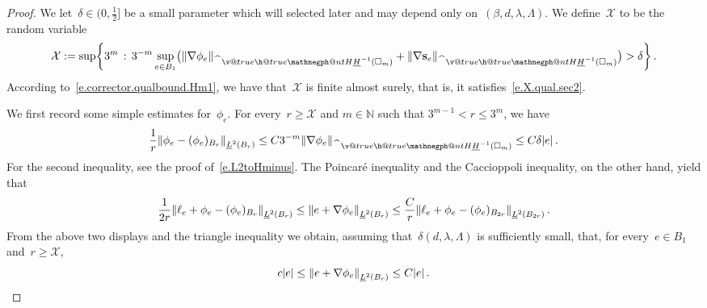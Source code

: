 \documentclass[11pt]{article} %
\makeatletter
\let\oldsquare\square %
\renewcommand{\square}{\oldsquare}
\numberwithin{equation}{section}
\theoremstyle{definition}
\let\originalleft\left
\let\originalright\right
\renewcommand{\left}{\mathopen{}\mathclose\bgroup\originalleft}
\renewcommand{\right}{\aftergroup\egroup\originalright}
\newcommand*{\N}{\ensuremath{\mathbb{N}}}
\renewcommand*{\hat}{\widehat}
\newcommand{\s}{\mathbf{s}}
\newcommand{\cu}{\square}
\newcommand{\X}{\mathcal{X}}
\newcommand{\negphantom}{\v@true\h@true\negph@nt}
\newcommand{\negph@nt}{\ifmmode\expandafter\mathpalette 
  \expandafter\mathnegph@nt\else\expandafter\makenegph@nt\fi}
\newcommand{\makenegph@nt}[1]{%
  \setbox\z@\hbox{\color@begingroup#1\color@endgroup}\finnegph@nt}
\newcommand{\finnegph@nt}{%
  \setbox\tw@\null 
  \ifv@ \ht\tw@\ht\z@\dp\tw@\dp\z@\fi \ifh@\wd\tw@-\wd\z@\fi\box\tw@}
\newcommand{\mathnegph@nt}[2]{%
  \setbox\z@\hbox{$\m@th #1{#2}$}\finnegph@nt}
\newcommand{\Hminusul}{\hat{\phantom{H}}\negphantom{H}\underline{H}^{-1}}
\makeatother
\begin{document}
\begin{proof}
We let~$\delta\in (0,\tfrac12]$ be a small parameter which will selected later and may depend only on~$(\beta,d,\lambda,\Lambda)$. We define~$\X$ to be the random variable
\begin{equation}
\label{e.XC11}
\X:= 
\sup\left\{ 3^m \,:\, 
3^{-m} 
\sup_{e\in B_1}
\bigl(
\left\| \nabla \phi_e \right\|_{\Hminusul(\cu_m)}
+
\left\| \nabla \s_e \right\|_{\Hminusul(\cu_m)}
\bigr)
> \delta
\right\}
\,.
\end{equation}
According to~\eqref{e.corrector.qualbound.Hm1}, we have that~$\X$ is finite almost surely, that is, it satisfies~\eqref{e.X.qual.sec2}. 

\smallskip

We first record some simple estimates for~$\phi_e$. 
For every~$r\geq \X$ and $m \in \N$ such that $3^{m-1} < r \leq 3^m$, we have 
\begin{align}
\label{e.correbounds.pre}
\frac1r
\left\| \phi_e - (\phi_e)_{B_r} \right\|_{\underline{L}^{2}(B_r)} 
\leq  
C 
3^{-m} \left\| \nabla \phi_e \right\|_{\Hminusul(\cu_m)} 
\leq 
C\delta |e|
\,.
\end{align}
For the second inequality, see the proof of~\eqref{e.L2toHminus}. The Poincar\'e inequality and the Caccioppoli inequality, on the other hand, yield that
\begin{align*}  
\frac 1{2r} \left\| \ell_e + \phi_e - (\phi_e)_{B_r} \right\|_{\underline{L}^{2}(B_r)} 
\leq 
\left\| e + \nabla \phi_e \right\|_{\underline{L}^{2}(B_{r})}   
\leq
\frac{C}{r} \left\| \ell_e + \phi_e - (\phi_e)_{B_{2r}} \right\|_{\underline{L}^{2}(B_{2r})} 
\,.
\end{align*}
From the above two displays and the triangle inequality we obtain, assuming that~$\delta(d,\lambda,\Lambda)$ is sufficiently small, that, for every~$e\in B_1$ and~$r\geq \X$, 
\begin{equation}
\label{e.correbounds}
c |e|
\leq
\left\| e + \nabla \phi_e \right\|_{\underline{L}^{2}(B_{r})} 
\leq 
C |e| \,.
\end{equation}


\smallskip


\end{proof}
\end{document}
